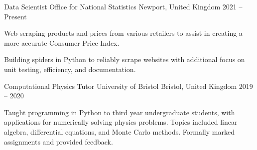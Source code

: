 
\begin{cventries}

    \cventry
        {Data Scientist} %
        {Office for National Statistics} %
        {Newport, United Kingdom} %
        {2021 -- Present} %
        {
            \begin{cvitems} %
                \item{Web scraping products and prices from various retailers to assist in creating a more accurate Consumer Price Index.}
                \item{Building spiders in Python to reliably scrape websites with additional focus on unit testing, efficiency, and documentation.}
            \end{cvitems}
        }

    \cventry
        {Computational Physics Tutor} %
        {University of Bristol} %
        {Bristol, United Kingdom} %
        {2019 -- 2020} %
        {
            \begin{cvitems} %
                \item{Taught programming in Python to third year undergraduate students, with applications for numerically solving physics problems. Topics included linear algebra, differential equations, and Monte Carlo methods. Formally marked assignments and provided feedback.}
            \end{cvitems}
        }


\end{cventries}
